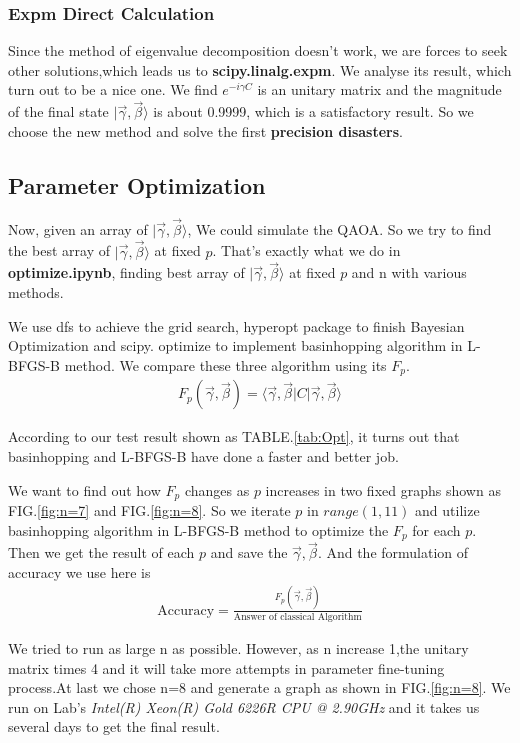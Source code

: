 \subsubsection{Expm Direct Calculation}
Since the method of eigenvalue decomposition doesn't work, we are forces to seek other solutions,which leads us to \textbf{scipy.linalg.expm}. We analyse its result, which turn out to be a nice one. We find $e^{-i\gamma C}$ is an unitary matrix and the magnitude of the final state $|\vec{\gamma}, \vec{\beta}\rangle $ is about 0.9999, which is a satisfactory result. So we choose the new method and solve the first \textbf{precision disasters}.

\subsection{Parameter Optimization}

Now, given an array of $|\vec{\gamma}, \vec{\beta}\rangle$, We could simulate the QAOA. So we try to find the best array of $|\vec{\gamma}, \vec{\beta}\rangle$ at fixed $p$. That's exactly what we do in \textbf{optimize.ipynb}, finding best array of $|\vec{\gamma}, \vec{\beta}\rangle$ at fixed $p$ and n with various methods.

We use dfs to achieve the grid search, hyperopt package\cite{bergstra2013making} to finish Bayesian Optimization and scipy. optimize to implement basinhopping algorithm in L-BFGS-B method. We compare these three algorithm using its $F_p$. 
\begin{align*}
    F_p(\vec{\gamma}, \vec{\beta}) = \langle\vec{\gamma},\vec{\beta}| C |\vec{\gamma},\vec{\beta}\rangle
\end{align*}

According to our test result shown as TABLE.\ref{tab:Opt}, it turns out that basinhopping and L-BFGS-B have done a faster and better job. 

We want to find out how $F_p$ changes as $p$ increases in two fixed graphs shown as FIG.\ref{fig:n=7} and FIG.\ref{fig:n=8}. So we iterate $p$ in $range(1,11)$  and utilize basinhopping algorithm in L-BFGS-B method to optimize the $F_p$  for each $p$. Then we get the result of each $p$ and save the $\vec{\gamma},\vec{\beta}$. And the formulation of accuracy we use here is 
\begin{align*}
    \text{Accuracy}=\frac{F_p(\vec{\gamma}, \vec{\beta})}{\text{Answer of classical Algorithm}}
\end{align*}


We tried to run as large n as possible. However, as n increase 1,the unitary matrix times 4 and it will take more attempts in parameter fine-tuning process.At last we chose n=8 and generate a graph as shown in FIG.\ref{fig:n=8}. We run on Lab's \textit{Intel(R) Xeon(R) Gold 6226R CPU @ 2.90GHz} and it takes us several days to get the final result.

